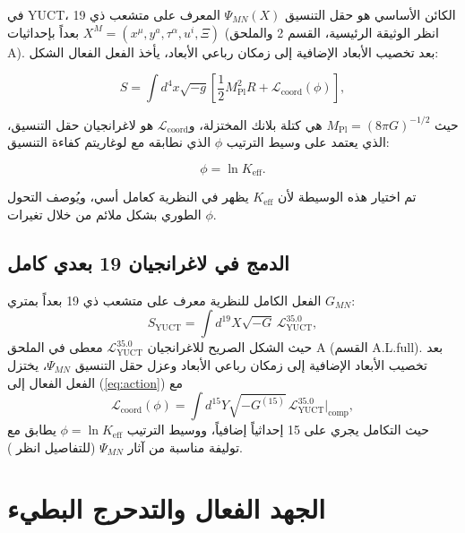 \documentclass[11pt,a4paper]{article}
\theoremstyle{remark}
\newcommand{\Keff}{K_{\mathrm{eff}}}
\newcommand{\Mpl}{M_{\mathrm{Pl}}}
\begin{document}
	في YUCT، الكائن الأساسي هو حقل التنسيق $\Psi_{MN}(X)$ المعرف على متشعب ذي 19 بعداً بإحداثيات $X^M = (x^\mu, y^a, \tau^\alpha, u^i, \Xi)$ (انظر الوثيقة الرئيسية، القسم 2 والملحق A). بعد تخصيب الأبعاد الإضافية إلى زمكان رباعي الأبعاد، يأخذ الفعل الفعال الشكل:
	
	\begin{equation}
		S = \int d^4x \sqrt{-g} \left[ \frac{1}{2} \Mpl^2 R + \mathcal{L}_{\mathrm{coord}}(\phi) \right],
		\label{eq:action}
	\end{equation}
	
	حيث $\Mpl = (8\pi G)^{-1/2}$ هي كتلة بلانك المختزلة، و$\mathcal{L}_{\mathrm{coord}}$ هو لاغرانجيان حقل التنسيق، الذي يعتمد على وسيط الترتيب $\phi$ الذي نطابقه مع لوغاريتم كفاءة التنسيق:
	
	\begin{equation}
		\phi = \ln \Keff.
		\label{eq:phi-def}
	\end{equation}
	
	تم اختيار هذه الوسيطة لأن $\Keff$ يظهر في النظرية كعامل أسي، ويُوصف التحول الطوري بشكل ملائم من خلال تغيرات $\phi$.
	
	\subsection{الدمج في لاغرانجيان 19 بعدي كامل}
	
	الفعل الكامل للنظرية معرف على متشعب ذي 19 بعداً بمتري $G_{MN}$:
	\begin{equation}
		S_{\text{YUCT}} = \int d^{19}X \sqrt{-G} \, \mathcal{L}_{\text{YUCT}}^{35.0},
		\label{eq:full-action}
	\end{equation}
	حيث الشكل الصريح للاغرانجيان $\mathcal{L}_{\text{YUCT}}^{35.0}$ معطى في الملحق A (القسم A.L.full). بعد تخصيب الأبعاد الإضافية إلى زمكان رباعي الأبعاد وعزل حقل التنسيق $\Psi_{MN}$، يختزل الفعل الفعال إلى (\ref{eq:action}) مع
	\begin{equation}
		\mathcal{L}_{\mathrm{coord}}(\phi) = \int d^{15}Y \sqrt{-G^{(15)}} \, \mathcal{L}_{\text{YUCT}}^{35.0}\big|_{\text{comp}},
	\end{equation}
	حيث التكامل يجري على 15 إحداثياً إضافياً، ووسيط الترتيب $\phi = \ln\Keff$ يطابق مع توليفة مناسبة من آثار $\Psi_{MN}$ (للتفاصيل انظر \cite{Yakushev2026}).
	
	\section{الجهد الفعال والتدحرج البطيء}
	\label{sec:potential}
	
\end{document}
